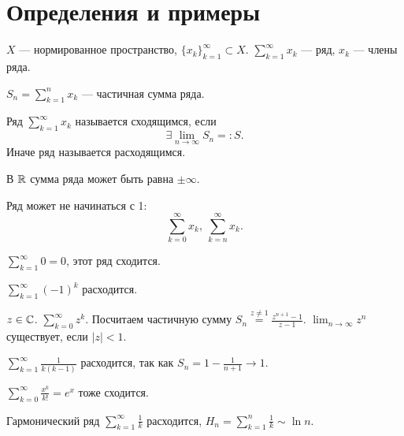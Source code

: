 \section{Определения и примеры}
\begin{defn}
    $ X$ --- нормированное пространство, $ \{x_k\}_{k=1}^{\infty} \subset X$. 
    $ \sum_{k=1}^{\infty}  x_k$ --- {\sf ряд}, $ x_k$ ---  {\sf  члены ряда}.    

    $ S_n = \sum_{k= 1}^{n} x_k$ --- {\sf частичная сумма ряда}.  
\end{defn}
\begin{defn}
    Ряд  $ \sum_{k=1}^{\infty} x_k$ называется {\sf сходящимся}, если 
    \[
    \exists \lim_{n \to \infty} S_n =: S
    .\] 
    Иначе ряд называется {\sf расходящимся}.  
\end{defn}
\begin{rem}
    В $ \mathbb{R}$ сумма ряда может быть равна  $ \pm \infty$.
\end{rem}
\begin{rem}
    Ряд может не начинаться с 1:
    \[
	\sum_{k=0}^{\infty} x_k, ~ \sum_{k=n}^{\infty} x_k
    .\] 
\end{rem}
\begin{ex}
    $ \sum_{k=1}^{\infty} 0 = 0$, этот ряд сходится.
\end{ex}
\begin{ex}
    $
	\sum_{k=1}^{\infty} (-1)^{k}
	$  расходится.
\end{ex}
\begin{ex}
    $ z \in \mathbb{C}$. $ \sum_{k=0}^{\infty} z^{k}$. Посчитаем частичную сумму $ S_n \stackrel{z\ne 1}{=} \frac{z^{n+1} -1}{z-1}$. $ \lim_{n \to \infty} z^{n}$ существует, если $ \lvert z \rvert < 1$.
\end{ex}
\begin{ex}
    $ \sum_{k=1}^{\infty} \frac{1}{k(k-1)} $ расходится, так как $ S_n = 1 - \frac{1}{n+1} \to  1$.
\end{ex}
\begin{ex}
    $ \sum_{k=0}^{\infty} \frac{x^{k}}{k!} = e^{x}$ тоже сходится.
\end{ex}
\begin{ex}
    Гармонический ряд $ \sum_{k=1}^{\infty} \frac{1}{k}$ расходится, $ H_n = \sum_{k=1}^{n} \frac{1}{k} \sim \ln n$.
\end{ex}

